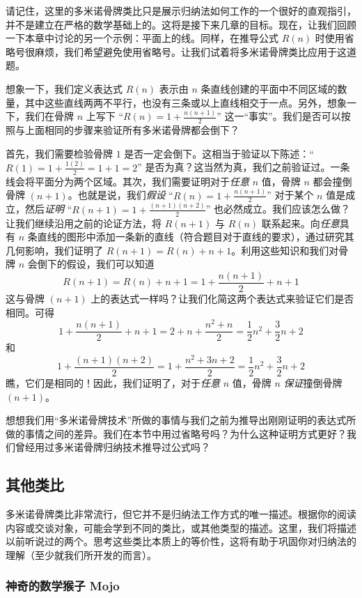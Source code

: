 请记住，这里的多米诺骨牌类比只是展示归纳法如何工作的一个很好的直观指引，并不是建立在严格的数学基础上的。这将是接下来几章的目标。现在，让我们回顾一下本章中讨论的另一个示例：平面上的线。同样，在推导公式 $R(n)$ 时使用省略号很麻烦，我们希望避免使用省略号。让我们试着将多米诺骨牌类比应用于这道题。

想象一下，我们定义表达式 $R(n)$ 表示由 $n$ 条直线创建的平面中不同区域的数量，其中这些直线两两不平行，也没有三条或以上直线相交于一点。另外，想象一下，我们在骨牌 $n$ 上写下 ``$R(n) = 1 + \frac{n(n+1)}{2}$'' 这一``事实''。我们是否可以按照与上面相同的步骤来验证所有多米诺骨牌都会倒下？

首先，我们需要检验骨牌 $1$ 是否一定会倒下。这相当于验证以下陈述：``$R(1) = 1+\frac{1(2)}{2} = 1+1 = 2$'' 是否为真？这当然为真，我们之前验证过。一条线会将平面分为两个区域。其次，我们需要证明对于\emph{任意} $n$ 值，骨牌 $n$ 都会撞倒骨牌 $(n + 1)$。也就是说，我们\emph{假设} ``$R(n) = 1 + \frac{n(n+1)}{2}$'' 对于某个 $n$ 值是成立，然后\emph{证明} ``$R(n + 1) = 1 + \frac{(n+1)(n +2)}{2}$'' 也必然成立。我们应该怎么做？让我们继续沿用之前的论证方法，将 $R(n + 1)$ 与 $R(n)$ 联系起来。向\emph{任意}具有 $n$ 条直线的图形中添加一条新的直线（符合题目对于直线的要求），通过研究其几何影响，我们证明了 $R(n+ 1) = R(n) +n+ 1$。利用这些知识和我们对骨牌 $n$ 会倒下的假设，我们可以知道
\[R(n + 1) = R(n) + n + 1 = 1 +\frac{n(n+1)}{2}+ n + 1\]
这与骨牌 $(n + 1)$ 上的表达式一样吗？让我们化简这两个表达式来验证它们是否相同。可得
\[1 +\frac{n(n+1)}{2}+ n + 1=2+n+\frac{n^2+n}{2} = \frac{1}{2}n^2+\frac{3}{2}n+2\]
和
\[1 + \frac{(n+1)(n +2)}{2} = 1+\frac{n^2+3n+2}{2} =  \frac{1}{2}n^2+\frac{3}{2}n+2\]
瞧，它们是相同的！因此，我们证明了，对于\emph{任意} $n$ 值，骨牌 $n$ \emph{保证}撞倒骨牌 $(n+1)$。

想想我们用``多米诺骨牌技术''所做的事情与我们之前为推导出刚刚证明的表达式所做的事情之间的差异。我们在本节中用过省略号吗？为什么这种证明方式更好？我们曾经用过多米诺骨牌归纳技术推导过公式吗？

\subsection{其他类比}

多米诺骨牌类比非常流行，但它并不是归纳法工作方式的唯一描述。根据你的阅读内容或交谈对象，可能会学到不同的类比，或其他类型的描述。这里，我们将描述以前听说过的两个。思考这些类比本质上的等价性，这将有助于巩固你对归纳法的理解（至少就我们所开发的而言）。

\subsubsection*{神奇的数学猴子 Mojo}

